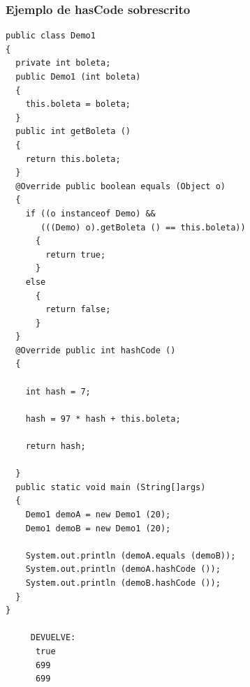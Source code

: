 \documentclass{beamer}
\begin{document}
\begin{frame}[fragile]
\frametitle{Ejemplo de hasCode sobrescrito}
\begin{tiny}
\begin{multicols}{2}
\begin{verbatim}
public class Demo1
{
  private int boleta;
  public Demo1 (int boleta)
  {
    this.boleta = boleta;
  }
  public int getBoleta ()
  {
    return this.boleta;
  }
  @Override public boolean equals (Object o)
  {
    if ((o instanceof Demo) && 
       (((Demo) o).getBoleta () == this.boleta))
      {
        return true;
      }
    else
      {
        return false;
      }
  }
  @Override public int hashCode ()
  {

    int hash = 7;

    hash = 97 * hash + this.boleta;

    return hash;

  }
  public static void main (String[]args)
  {
    Demo1 demoA = new Demo1 (20);
    Demo1 demoB = new Demo1 (20);

    System.out.println (demoA.equals (demoB));
    System.out.println (demoA.hashCode ());
    System.out.println (demoB.hashCode ());
  }
}

     DEVUELVE:
      true
      699
      699
\end{verbatim}
\end{multicols}
\end{tiny}
\end{frame}
\end{document}

